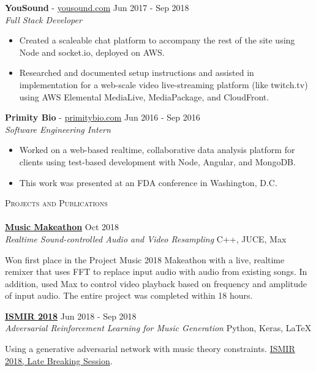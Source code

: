 \documentclass[a4paper]{article}
\newcommand{\lineunder} {
	\vspace*{-8pt} \\
	\hspace*{-18pt} \hrulefill \\
}
\newcommand{\header} [1] {
	{\hspace*{-18pt}\vspace*{6pt} \textsc{#1}}
	\vspace*{-6pt} \lineunder
}
\begin{document}
\noindent
\textbf{YouSound} - \url{yousound.com} \hfill Jun 2017 - Sep 2018\\
\textit{Full Stack Developer} \\
\vspace{-6mm}
\begin{itemize} \itemsep 0.1pt
	\item Created a scaleable chat platform to accompany the rest of the site using Node and socket.io, deployed on AWS.
	\item Researched and documented setup instructions and assisted in implementation for a web-scale video live-streaming platform (like twitch.tv) using AWS Elemental MediaLive, MediaPackage, and CloudFront.
\end{itemize}

\noindent
\textbf{Primity Bio} - \url{primitybio.com} \hfill Jun 2016 - Sep 2016\\
\textit{Software Engineering Intern} \\
\vspace{-6mm}
\begin{itemize} \itemsep 0.1pt
	\item Worked on a web-based realtime, collaborative data analysis platform for clients using test-based development with Node, Angular, and MongoDB.
	\item This work was presented at an FDA conference in Washington, D.C.
\end{itemize}



\header{Projects and Publications}
\noindent
\href{https://github.com/nacgarg/music-makeathon}{\textbf{Music Makeathon}} \hfill Oct 2018\\
\textit{Realtime Sound-controlled Audio and Video Resampling} \hfill C++, JUCE, Max \\
\vspace{-25pt}
\begin{paragraph}{}
	Won first place in the Project Music 2018 Makeathon with a live, realtime remixer that uses FFT to replace input audio with audio from existing songs. In addition, used Max to control video playback based on frequency and amplitude of input audio. The entire project was completed within 18 hours.\\
\end{paragraph}


\noindent
\href{http://ismir2018.ircam.fr/pages/events-lbd.html}{\textbf{ISMIR 2018}} \hfill Jun 2018 - Sep 2018\\
\textit{Adversarial Reinforcement Learning for Music Generation} \hfill Python, Keras, \LaTeX\\
\vspace{-25pt}
\begin{paragraph}{}
\begin{sloppypar}
Using a generative adversarial network with music theory constraints. \href{http://ismir2018.ircam.fr/pages/events-lbd.html}{ISMIR 2018, Late Breaking Session}.\\
\end{sloppypar}
\end{paragraph}
\end{document}
